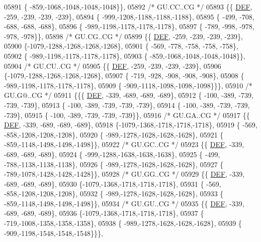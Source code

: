 \begin{DoxyCode}
05891 \{ -859,-1068,-1048,-1048,-1048\}\},
05892 \textcolor{comment}{/* GU.CC..CG */}
05893 \{\{  \mbox{\hyperlink{1_88_84__epars_8h_a397419fc12b37ed479c8abb9d444d843}{DEF}}, -259, -239, -239, -239\},
05894 \{ -999,-1208,-1188,-1188,-1188\},
05895 \{ -499, -708, -688, -688, -688\},
05896 \{ -989,-1198,-1178,-1178,-1178\},
05897 \{ -789, -998, -978, -978, -978\}\},
05898 \textcolor{comment}{/* GU.CG..CG */}
05899 \{\{  \mbox{\hyperlink{1_88_84__epars_8h_a397419fc12b37ed479c8abb9d444d843}{DEF}}, -259, -239, -239, -239\},
05900 \{-1079,-1288,-1268,-1268,-1268\},
05901 \{ -569, -778, -758, -758, -758\},
05902 \{ -989,-1198,-1178,-1178,-1178\},
05903 \{ -859,-1068,-1048,-1048,-1048\}\},
05904 \textcolor{comment}{/* GU.CU..CG */}
05905 \{\{  \mbox{\hyperlink{1_88_84__epars_8h_a397419fc12b37ed479c8abb9d444d843}{DEF}}, -259, -239, -239, -239\},
05906 \{-1079,-1288,-1268,-1268,-1268\},
05907 \{ -719, -928, -908, -908, -908\},
05908 \{ -989,-1198,-1178,-1178,-1178\},
05909 \{ -909,-1118,-1098,-1098,-1098\}\}\},
05910 \textcolor{comment}{/* GU.G@..CG */}
05911 \{\{\{  \mbox{\hyperlink{1_88_84__epars_8h_a397419fc12b37ed479c8abb9d444d843}{DEF}}, -339, -689, -689, -689\},
05912 \{ -100, -389, -739, -739, -739\},
05913 \{ -100, -389, -739, -739, -739\},
05914 \{ -100, -389, -739, -739, -739\},
05915 \{ -100, -389, -739, -739, -739\}\},
05916 \textcolor{comment}{/* GU.GA..CG */}
05917 \{\{  \mbox{\hyperlink{1_88_84__epars_8h_a397419fc12b37ed479c8abb9d444d843}{DEF}}, -339, -689, -689, -689\},
05918 \{-1079,-1368,-1718,-1718,-1718\},
05919 \{ -569, -858,-1208,-1208,-1208\},
05920 \{ -989,-1278,-1628,-1628,-1628\},
05921 \{ -859,-1148,-1498,-1498,-1498\}\},
05922 \textcolor{comment}{/* GU.GC..CG */}
05923 \{\{  \mbox{\hyperlink{1_88_84__epars_8h_a397419fc12b37ed479c8abb9d444d843}{DEF}}, -339, -689, -689, -689\},
05924 \{ -999,-1288,-1638,-1638,-1638\},
05925 \{ -499, -788,-1138,-1138,-1138\},
05926 \{ -989,-1278,-1628,-1628,-1628\},
05927 \{ -789,-1078,-1428,-1428,-1428\}\},
05928 \textcolor{comment}{/* GU.GG..CG */}
05929 \{\{  \mbox{\hyperlink{1_88_84__epars_8h_a397419fc12b37ed479c8abb9d444d843}{DEF}}, -339, -689, -689, -689\},
05930 \{-1079,-1368,-1718,-1718,-1718\},
05931 \{ -569, -858,-1208,-1208,-1208\},
05932 \{ -989,-1278,-1628,-1628,-1628\},
05933 \{ -859,-1148,-1498,-1498,-1498\}\},
05934 \textcolor{comment}{/* GU.GU..CG */}
05935 \{\{  \mbox{\hyperlink{1_88_84__epars_8h_a397419fc12b37ed479c8abb9d444d843}{DEF}}, -339, -689, -689, -689\},
05936 \{-1079,-1368,-1718,-1718,-1718\},
05937 \{ -719,-1008,-1358,-1358,-1358\},
05938 \{ -989,-1278,-1628,-1628,-1628\},
05939 \{ -909,-1198,-1548,-1548,-1548\}\}\},

\end{DoxyCode}
